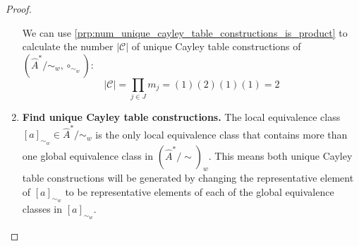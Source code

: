 \begin{proof}
\begin{enumerate}[(1)]
    We can use \cref{prp:num_unique_cayley_table_constructions_is_product} to calculate the number $|\mathcal{C}|$ of unique Cayley table constructions of $(\hat{A}^{*}/\sim_{w}, \circ_{\sim_{w}})$:
    \begin{equation}
        |\mathcal{C}| = \prod_{j \in J} m_{j} = (1)(2)(1)(1) = 2
    \end{equation}

    \item \textbf{Find unique Cayley table constructions.}
    The local equivalence class $[a]_{\sim_{w}} \in \hat{A}^{*}/\sim_{w}$ is the only local equivalence class that contains more than one global equivalence class in $(\hat{A}^{*}/\sim)_{w}$.
    This means both unique Cayley table constructions will be generated by changing the representative element of $[a]_{\sim_{w}}$ to be representative elements of each of the global equivalence classes in $[a]_{\sim_{w}}$.


\end{enumerate}
\end{proof}
